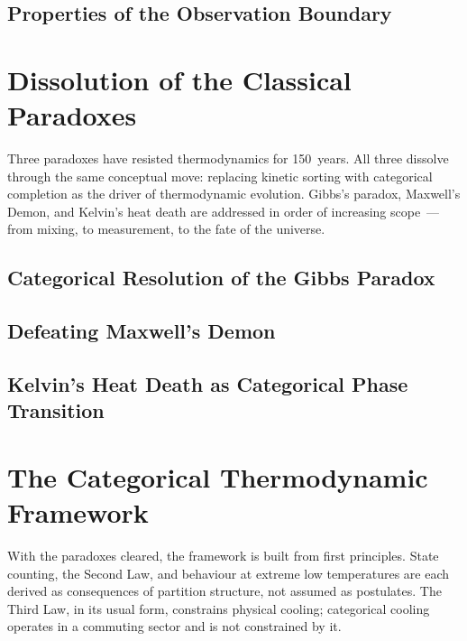 \documentclass[12pt,a4paper,twoside,openright]{book}
\theoremstyle{plain}
\theoremstyle{definition}
\theoremstyle{remark}
\begin{document}
\chapter{Properties of the Observation Boundary}
\label{ch:obs}


\part{Dissolution of the Classical Paradoxes}
\label{part:paradoxes}

\noindent
Three paradoxes have resisted thermodynamics for 150~years.
All three dissolve through the same conceptual move: replacing kinetic sorting
with categorical completion as the driver of thermodynamic evolution.
Gibbs's paradox, Maxwell's Demon, and Kelvin's heat death are addressed
in order of increasing scope~--- from mixing, to measurement, to the fate
of the universe.

\chapter{Categorical Resolution of the Gibbs Paradox}
\label{ch:gibbs}


\chapter{Defeating Maxwell's Demon}
\label{ch:demon}


\chapter{Kelvin's Heat Death as Categorical Phase Transition}
\label{ch:kelvin}


\part{The Categorical Thermodynamic Framework}
\label{part:framework}

\noindent
With the paradoxes cleared, the framework is built from first principles.
State counting, the Second Law, and behaviour at extreme low temperatures
are each derived as consequences of partition structure, not assumed as postulates.
The Third Law, in its usual form, constrains physical cooling; categorical
cooling operates in a commuting sector and is not constrained by it.
\end{document}
